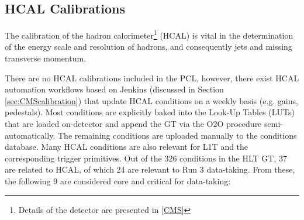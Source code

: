 \subsection{HCAL Calibrations}

The calibration of the hadron calorimeter\footnote{Details of the detector are presented in \ref{CMS}} (HCAL) is vital in the determination of the energy scale and resolution of hadrons, and consequently jets and missing transverse momentum.

There are no HCAL calibrations included in the PCL, however, there exist HCAL automation workflows based on Jenkins (discussed in Section \ref{sec:CMScalibration}) that update HCAL conditions on a weekly basis (e.g. gains, pedestals). Most conditions are explicitly baked into the Look-Up Tables (LUTs) that are loaded on-detector and append the GT via the O2O procedure semi-automatically. The remaining conditions are uploaded manually to the conditions database. Many HCAL conditions are also relevant for L1T and the corresponding trigger primitives. Out of the 326 conditions in the HLT GT, 37 are related to HCAL, of which 24 are relevant to Run 3 data-taking. From these, the following 9 are considered core and critical for data-taking:

